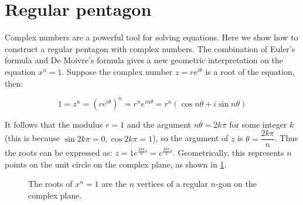 \documentclass[b5paper]{article}
\begin{document}
\section{Regular pentagon}
\label{sec:pentagon-equation} 

Complex numbers are a powerful tool for solving equations. Here we show how to construct a regular pentagon with complex numbers. The combination of Euler's formula and De Moivre's formula gives a new geometric interpretation on the equation $x^n = 1$. Suppose the complex number $z = re^{i\theta}$ is a root of the equation, then:

\[
1 = z^n = (re^{i\theta})^n = r^ne^{in\theta} = r^n(\cos n\theta + i\sin n\theta)
\]

It follows that the modulus $r = 1$ and the argument $n\theta = 2k\pi$ for some integer $k$ (this is because $\sin 2k\pi = 0, \cos 2k\pi = 1$), so the argument of $z$ is $\theta = \dfrac{2k\pi}{n}$. Thus the roots can be expressed as: $z = 1e^{\frac{2k\pi}{n}i} = e^{\frac{2k\pi}{n}i}$. Geometrically, this represents $n$ points on the unit circle on the complex plane, as shown in \cref{fig:heptagon-z}.

\begin{figure}[htbp]
  \centering
  \caption{The roots of $x^n = 1$ are the $n$ vertices of a regular $n$-gon on the complex plane.}
 \label{fig:heptagon-z}
\end{figure}
\end{document}
